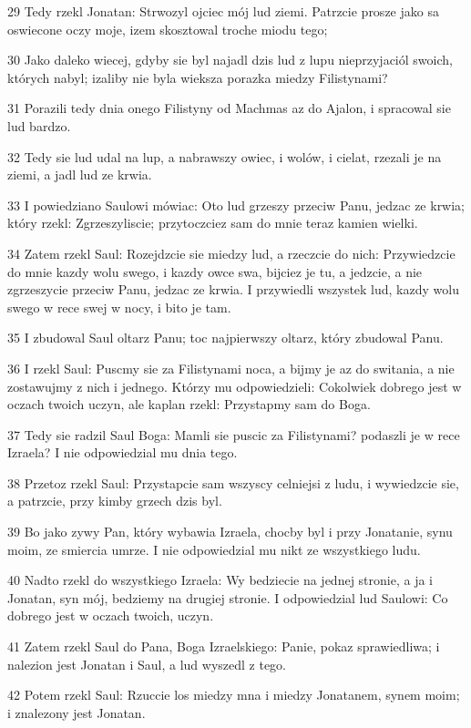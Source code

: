 \par 29 Tedy rzekl Jonatan: Strwozyl ojciec mój lud ziemi. Patrzcie prosze jako sa oswiecone oczy moje, izem skosztowal troche miodu tego;
\par 30 Jako daleko wiecej, gdyby sie byl najadl dzis lud z lupu nieprzyjaciól swoich, których nabyl; izaliby nie byla wieksza porazka miedzy Filistynami?
\par 31 Porazili tedy dnia onego Filistyny od Machmas az do Ajalon, i spracowal sie lud bardzo.
\par 32 Tedy sie lud udal na lup, a nabrawszy owiec, i wolów, i cielat, rzezali je na ziemi, a jadl lud ze krwia.
\par 33 I powiedziano Saulowi mówiac: Oto lud grzeszy przeciw Panu, jedzac ze krwia; który rzekl: Zgrzeszyliscie; przytoczciez sam do mnie teraz kamien wielki.
\par 34 Zatem rzekl Saul: Rozejdzcie sie miedzy lud, a rzeczcie do nich: Przywiedzcie do mnie kazdy wolu swego, i kazdy owce swa, bijciez je tu, a jedzcie, a nie zgrzeszycie przeciw Panu, jedzac ze krwia. I przywiedli wszystek lud, kazdy wolu swego w rece swej w nocy, i bito je tam.
\par 35 I zbudowal Saul oltarz Panu; toc najpierwszy oltarz, który zbudowal Panu.
\par 36 I rzekl Saul: Puscmy sie za Filistynami noca, a bijmy je az do switania, a nie zostawujmy z nich i jednego. Którzy mu odpowiedzieli: Cokolwiek dobrego jest w oczach twoich uczyn, ale kaplan rzekl: Przystapmy sam do Boga.
\par 37 Tedy sie radzil Saul Boga: Mamli sie puscic za Filistynami? podaszli je w rece Izraela? I nie odpowiedzial mu dnia tego.
\par 38 Przetoz rzekl Saul: Przystapcie sam wszyscy celniejsi z ludu, i wywiedzcie sie, a patrzcie, przy kimby grzech dzis byl.
\par 39 Bo jako zywy Pan, który wybawia Izraela, chocby byl i przy Jonatanie, synu moim, ze smiercia umrze. I nie odpowiedzial mu nikt ze wszystkiego ludu.
\par 40 Nadto rzekl do wszystkiego Izraela: Wy bedziecie na jednej stronie, a ja i Jonatan, syn mój, bedziemy na drugiej stronie. I odpowiedzial lud Saulowi: Co dobrego jest w oczach twoich, uczyn.
\par 41 Zatem rzekl Saul do Pana, Boga Izraelskiego: Panie, pokaz sprawiedliwa; i nalezion jest Jonatan i Saul, a lud wyszedl z tego.
\par 42 Potem rzekl Saul: Rzuccie los miedzy mna i miedzy Jonatanem, synem moim; i znalezony jest Jonatan.
